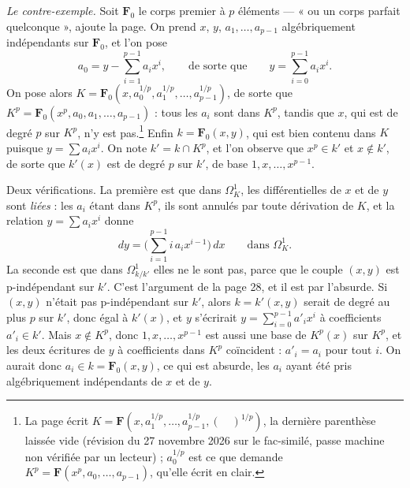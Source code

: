 \documentclass[11pt,a4paper]{article}
\begin{document}
\emph{Le contre-exemple.} Soit $\mathbf{F}_0$ le corps premier à $p$ éléments
— « ou un corps parfait quelconque », ajoute la page. On prend $x$, $y$,
$a_1, \ldots, a_{p-1}$ algébriquement indépendants sur $\mathbf{F}_0$, et l'on
pose
\[
  a_0 = y - \sum_{i=1}^{p-1} a_i x^{i} ,
  \qquad\text{de sorte que}\qquad
  y = \sum_{i=0}^{p-1} a_i x^{i} .
\]
On pose alors $K = \mathbf{F}_0(x, a_0^{1/p}, a_1^{1/p}, \ldots,
a_{p-1}^{1/p})$, de sorte que $K^p = \mathbf{F}_0(x^p, a_0, a_1, \ldots,
a_{p-1})$ : tous les $a_i$ sont dans $K^p$, tandis que $x$, qui est de degré
$p$ sur $K^p$, n'y est pas.\footnote{La page écrit
$K = \mathbf{F}(x, a_1^{1/p}, \ldots, a_{p-1}^{1/p}, (\quad)^{1/p})$, la dernière
parenthèse laissée vide (révision du 27 novembre 2026 sur le fac-similé,
passe machine non vérifiée par un lecteur) ; $a_0^{1/p}$ est ce que demande
$K^p = \mathbf{F}(x^p, a_0, \ldots, a_{p-1})$, qu'elle écrit en clair.} Enfin $k = \mathbf{F}_0(x,y)$, qui est bien
contenu dans $K$ puisque $y = \sum a_i x^i$. On note $k' = k \cap K^p$, et l'on
observe que $x^p \in k'$ et $x \notin k'$, de sorte que $k'(x)$ est de degré
$p$ sur $k'$, de base $1, x, \ldots, x^{p-1}$.

Deux vérifications. La première est que dans $\Omega^1_K$, les différentielles
de $x$ et de $y$ sont \emph{liées} : les $a_i$ étant dans $K^p$, ils sont
annulés par toute dérivation de $K$, et la relation $y = \sum a_i x^i$ donne
\[
  d y = \Big(\sum_{i=1}^{p-1} i\,a_i x^{i-1}\Big)\,d x
  \qquad \text{dans } \Omega^1_K .
\]
La seconde est que dans $\Omega^1_{k/k'}$ elles ne le sont pas, parce que le
couple $(x,y)$ est p-indépendant sur $k'$. C'est l'argument de la page 28, et
il est par l'absurde. Si $(x,y)$ n'était pas p-indépendant sur $k'$, alors
$k = k'(x,y)$ serait de degré au plus $p$ sur $k'$, donc égal à $k'(x)$, et
$y$ s'écrirait $y = \sum_{i=0}^{p-1} a'_i x^{i}$ à coefficients $a'_i \in k'$.
Mais $x \notin K^p$, donc $1, x, \ldots, x^{p-1}$ est aussi une base de
$K^p(x)$ sur $K^p$, et les deux écritures de $y$ à coefficients dans $K^p$
coïncident : $a'_i = a_i$ pour tout $i$. On aurait donc $a_i \in k =
\mathbf{F}_0(x,y)$, ce qui est absurde, les $a_i$ ayant été pris
algébriquement indépendants de $x$ et de $y$.
\end{document}
